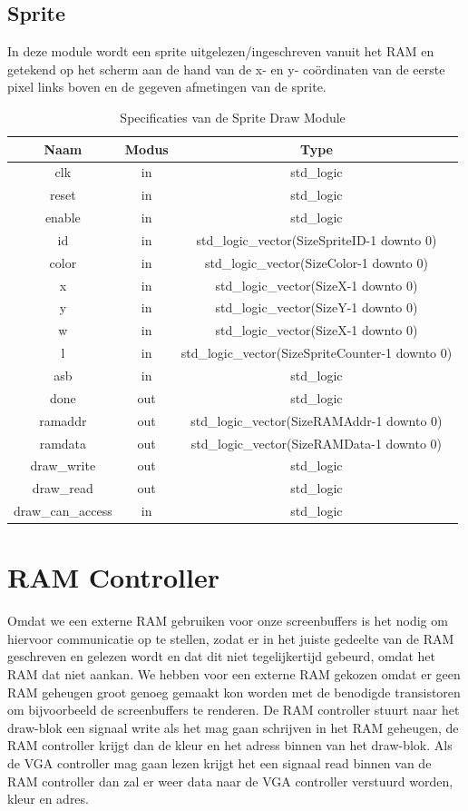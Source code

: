\documentclass{scrartcl} %
\begin{document}
\subsection {Sprite}
In deze module wordt een sprite uitgelezen/ingeschreven vanuit het RAM en getekend op het scherm aan de hand van de x- en y- coördinaten van de eerste pixel links boven en de gegeven afmetingen van de sprite.
\begin{table}[H]
\centering
\caption{Specificaties van de Sprite Draw Module}
\label{tab:spec-sprite-draw}
\begin{tabular}{c c c}
	\hline\hline
 	Naam & Modus & Type\\
 	\hline	
	clk & in & std\_logic \\
	reset & in & std\_logic \\
	enable& in & std\_logic \\
	id & in & std\_logic\_vector(SizeSpriteID-1 downto 0) \\
	color & in & std\_logic\_vector(SizeColor-1 downto 0) \\
	x & in & std\_logic\_vector(SizeX-1 downto 0) \\
	y & in & std\_logic\_vector(SizeY-1 downto 0) \\
	w & in & std\_logic\_vector(SizeX-1 downto 0) \\
	l & in & std\_logic\_vector(SizeSpriteCounter-1 downto 0) \\
	asb & in & std\_logic \\
	done & out & std\_logic \\
	ramaddr &out & std\_logic\_vector(SizeRAMAddr-1 downto 0) \\
	ramdata &out & std\_logic\_vector(SizeRAMData-1 downto 0) \\
	draw\_write &out & std\_logic \\
	draw\_read &out & std\_logic \\
	draw\_can\_access & in & std\_logic \\
  	\hline
\end{tabular}
\end{table}

\section{RAM Controller}
Omdat we een externe RAM gebruiken voor onze screenbuffers is het nodig om hiervoor communicatie op te stellen, zodat er in het juiste gedeelte van de RAM geschreven en gelezen wordt en dat dit niet tegelijkertijd gebeurd, omdat het RAM dat niet aankan. We hebben voor een externe RAM gekozen omdat er geen RAM geheugen groot genoeg gemaakt kon worden met de benodigde transistoren om bijvoorbeeld de screenbuffers te renderen. De RAM controller stuurt naar het draw-blok een signaal write als het mag gaan schrijven in het RAM geheugen, de RAM controller krijgt dan de kleur en het adress binnen van het draw-blok. Als de VGA controller mag gaan lezen krijgt het een signaal read binnen van de RAM controller dan zal er weer data naar de VGA controller verstuurd worden, kleur en adres.
\end{document}
